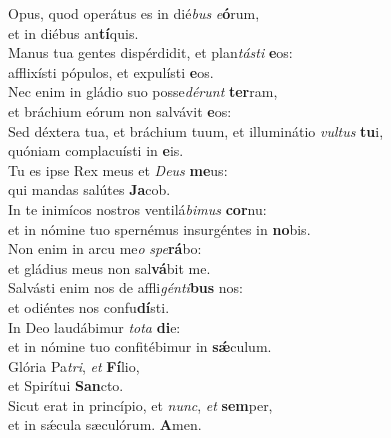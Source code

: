 \evenverse Opus, quod operátus es in dié\textit{bus} \textit{e}\textbf{ó}rum,~\*\\
\evenverse et in diébus an\textbf{tí}quis.\\
\oddverse Manus tua gentes dispérdidit, et plan\textit{tá}\textit{sti} \textbf{e}os:~\*\\
\oddverse afflixísti pópulos, et expulísti \textbf{e}os.\\
\evenverse Nec enim in gládio suo posse\textit{dé}\textit{runt} \textbf{ter}ram,~\*\\
\evenverse et bráchium eórum non salvávit \textbf{e}os:\\
\oddverse Sed déxtera tua, et bráchium tuum, et illuminátio \textit{vul}\textit{tus} \textbf{tu}i,~\*\\
\oddverse quóniam complacuísti in \textbf{e}is.\\
\evenverse Tu es ipse Rex meus et \textit{De}\textit{us} \textbf{me}us:~\*\\
\evenverse qui mandas salútes \textbf{Ja}cob.\\
\oddverse In te inimícos nostros ventilá\textit{bi}\textit{mus} \textbf{cor}nu:~\*\\
\oddverse et in nómine tuo spernémus insurgéntes in \textbf{no}bis.\\
\evenverse Non enim in arcu me\textit{o} \textit{spe}\textbf{rá}bo:~\*\\
\evenverse et gládius meus non sal\textbf{vá}bit me.\\
\oddverse Salvásti enim nos de affli\textit{gén}\textit{ti}\textbf{bus} nos:~\*\\
\oddverse et odiéntes nos confu\textbf{dí}sti.\\
\evenverse In Deo laudábimur \textit{to}\textit{ta} \textbf{di}e:~\*\\
\evenverse et in nómine tuo confitébimur in \textbf{sǽ}culum.\\
\oddverse Glória Pa\textit{tri}, \textit{et} \textbf{Fí}lio,~\*\\
\oddverse et Spirítui \textbf{San}cto.\\
\evenverse Sicut erat in princípio, et \textit{nunc}, \textit{et} \textbf{sem}per,~\*\\
\evenverse et in sǽcula sæculórum. \textbf{A}men.\\
